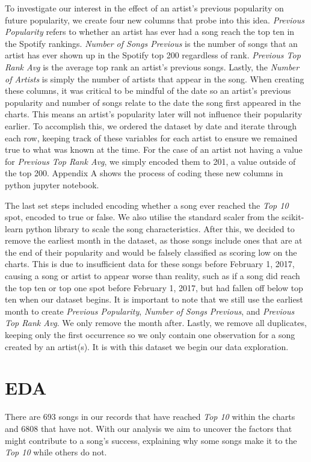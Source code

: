 \documentclass{article}
\begin{document}
To investigate our interest in the effect of an artist's previous popularity on future popularity, we create four new columns that probe into this idea. \textit{Previous Popularity} refers to whether an artist has ever had a song reach the top ten in the Spotify rankings. \textit{Number of Songs Previous} is the number of songs that an artist has ever shown up in the Spotify top 200 regardless of rank. \textit{Previous Top Rank Avg} is the average top rank an artist’s previous songs.  Lastly, the \textit{Number of Artists} is simply the number of artists that appear in the song. When creating these columns, it was critical to be mindful of the date so an artist's previous popularity and number of songs relate to the date the song first appeared in the charts. This means an artist’s popularity later will not influence their popularity earlier. To accomplish this, we ordered the dataset by date and iterate through each row, keeping track of these variables for each artist to ensure we remained true to what was known at the time. For the case of an artist not having a value for \textit{Previous Top Rank Avg}, we simply encoded them to 201, a value outside of the top 200. Appendix A shows the process of coding these new columns in python jupyter notebook.


	The last set steps included encoding whether a song ever reached the \textit{Top 10} spot, encoded to true or false. We also utilise the standard scaler from the scikit-learn python library to scale the song characteristics. After this, we decided to remove the earliest month in the dataset, as those songs include ones that are at the end of their popularity and would be falsely classified as scoring low on the charts. This is due to insufficient data for these songs before February 1, 2017, causing a song or artist to appear worse than reality, such as if a song did reach the top ten or top one spot before February 1, 2017, but had fallen off below top ten when our dataset begins. It is important to note that we still use the earliest month to create \textit{Previous Popularity}, \textit{Number of Songs Previous}, and \textit{Previous Top Rank Avg}. We only remove the month after. Lastly, we remove all duplicates, keeping only the first occurrence so we only contain one observation for a song created by an artist(s). It is with this dataset we begin our data exploration.


\section{EDA}
There are 693 songs in our records that have reached \textit{Top 10} within the charts and 6808 that have not. With our analysis we aim to uncover the factors that might contribute to a song’s success, explaining why some songs make it to the \textit{Top 10} while others do not. 
\end{document}
